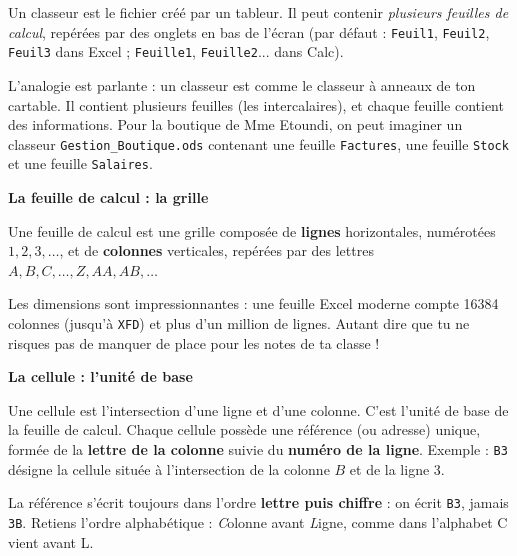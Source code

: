 \documentclass[11pt]{article}
\newcommand{\cle}[1]{{\popxbold\color{popdark}#1}}
\begin{document}
\begin{definition}[Classeur]
Un \cle{classeur} est le fichier créé par un tableur. Il peut contenir \emph{plusieurs feuilles de calcul}, repérées par des onglets en bas de l'écran (par défaut : \texttt{Feuil1}, \texttt{Feuil2}, \texttt{Feuil3} dans Excel ; \texttt{Feuille1}, \texttt{Feuille2}... dans Calc).
\end{definition}

L'analogie est parlante : un classeur est comme le classeur à anneaux de ton cartable. Il contient plusieurs feuilles (les intercalaires), et chaque feuille contient des informations. Pour la boutique de Mme Etoundi, on peut imaginer un classeur \texttt{Gestion\_Boutique.ods} contenant une feuille \texttt{Factures}, une feuille \texttt{Stock} et une feuille \texttt{Salaires}.

\textbf{La feuille de calcul : la grille}\par

\begin{definition}
Une \cle{feuille de calcul} est une grille composée de \textbf{lignes} horizontales, numérotées $1, 2, 3, \ldots$, et de \textbf{colonnes} verticales, repérées par des lettres $A, B, C, \ldots, Z, AA, AB, \ldots$
\end{definition}

Les dimensions sont impressionnantes : une feuille Excel moderne compte \num{16384} colonnes (jusqu'à \texttt{XFD}) et plus d'un million de lignes. Autant dire que tu ne risques pas de manquer de place pour les notes de ta classe !

\textbf{La cellule : l'unité de base}\par

\begin{definition}
Une \cle{cellule} est l'intersection d'une ligne et d'une colonne. C'est l'unité de base de la feuille de calcul. Chaque cellule possède une \cle{référence} (ou adresse) unique, formée de la \textbf{lettre de la colonne} suivie du \textbf{numéro de la ligne}. Exemple : \texttt{B3} désigne la cellule située à l'intersection de la colonne $B$ et de la ligne $3$.
\end{definition}

\begin{attention}
La référence s'écrit toujours dans l'ordre \textbf{lettre puis chiffre} : on écrit \texttt{B3}, jamais \texttt{3B}. Retiens l'ordre alphabétique : \emph{C}olonne avant \emph{L}igne, comme dans l'alphabet C vient avant L.
\end{attention}
\end{document}
